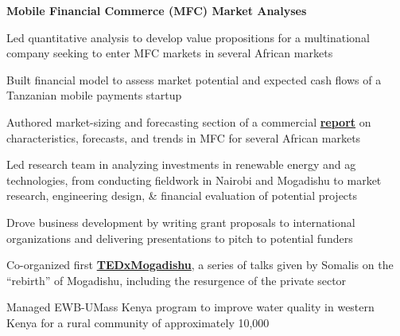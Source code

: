 \documentclass[letterpaper]{deedy-resume} %
\begin{document}
\begin{minipage}[t]{0.66\textwidth}
\begin{tightitemize}
\item {\bf Mobile Financial Commerce (MFC) Market Analyses}
\begin{tightitemize}
\vspace{\topsep} %
\item Led quantitative analysis to develop value propositions for a multinational company seeking to enter MFC markets in several African markets
\item Built financial model to assess market potential and expected cash flows of a Tanzanian mobile payments startup
\item Authored market-sizing and forecasting section of a commercial \href{http://www.mondato.com/publications/}{\bf report} on characteristics, forecasts, and trends in MFC for several African markets
\end{tightitemize}
\end{tightitemize}
\sectionspace %

\begin{tightitemize}
\item Led research team in analyzing investments in renewable energy and ag technologies, from conducting fieldwork in Nairobi and Mogadishu to market research, engineering design, \& financial evaluation of potential projects
\item Drove business development by writing grant proposals to international organizations and delivering presentations to pitch to potential funders
\item Co-organized first \href{http://tedxmogadishu.com/2012-talks/}{\bf TEDxMogadishu}, a series of talks given by Somalis on the “rebirth” of Mogadishu, including the resurgence of the private sector
\end{tightitemize}
\sectionspace %

\begin{tightitemize}
\item Managed EWB-UMass Kenya program to improve water quality in western Kenya for a rural community of approximately 10,000
\end{tightitemize}
\sectionspace %


\end{minipage}
\end{document}

